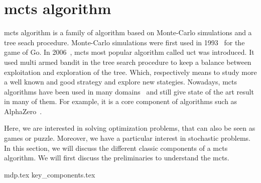 \section{\acrlong{mcts} algorithm}%
\label{sec:mcts_algorithm}

\gls{mcts} algorithm is a family of algorithm based on Monte-Carlo simulations and a tree seach procedure.
Monte-Carlo simulations were first used in 1993~\cite{mcgo} for the game of Go.
In 2006~\cite{uct}, \gls{mcts} most popular algorithm called \gls{uct} was introduced.
It used multi armed bandit in the tree search procedure to keep a balance between exploitation and exploration of the tree.
Which, respectively means to study more a well known and good strategy and explore new stategies.
Nowadays, \gls{mcts} algorithms have been used in many domains~\cite{survey_mcts} and still give state of the art result in many of them.
For example, it is a core component of algorithms such as AlphaZero~\cite{alphazero}.

Here, we are interested in solving optimization problems, that can also be seen as games or puzzle.
Moreover, we have a particular interest in stochastic problems.
In this section, we will discuss the different classic components of a \gls{mcts} algorithm.
We will first discuss the preliminaries to understand the \gls{mcts}.

{mdp.tex}
{key_components.tex}
